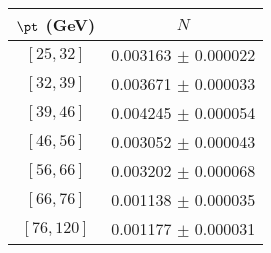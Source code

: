 \begin{tabular}{c||c}
$\pt$ (GeV) & $N$  \\
\hline
$[25, 32]$ & 0.003163 $\pm$ 0.000022\\
$[32, 39]$ & 0.003671 $\pm$ 0.000033\\
$[39, 46]$ & 0.004245 $\pm$ 0.000054\\
$[46, 56]$ & 0.003052 $\pm$ 0.000043\\
$[56, 66]$ & 0.003202 $\pm$ 0.000068\\
$[66, 76]$ & 0.001138 $\pm$ 0.000035\\
$[76, 120]$ & 0.001177 $\pm$ 0.000031\\
\end{tabular}
